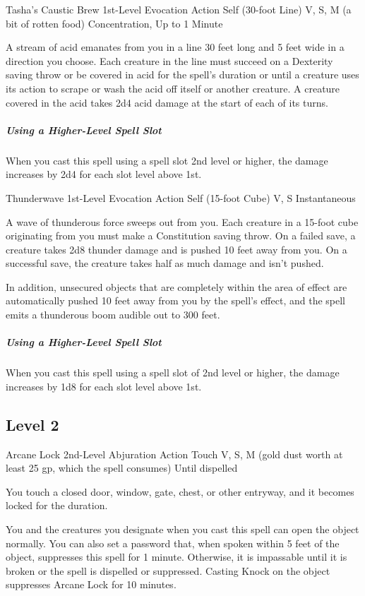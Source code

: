 \documentclass[letterpaper,openany,oneside,twocolumn]{book}
\begin{document}
\DndSpellHeader
  {Tasha's Caustic Brew}
  {1st-Level Evocation}
  {Action}
  {Self (30-foot Line)}
  {V, S, M (a bit of rotten food)}
  {Concentration, Up to 1 Minute}

A stream of acid emanates from you in a line 30 feet long and 5 feet wide in a direction you choose. Each creature in the line must succeed on a Dexterity saving throw or be covered in acid for the spell's duration or until a creature uses its action to scrape or wash the acid off itself or another creature. A creature covered in the acid takes 2d4 acid damage at the start of each of its turns.

\subparagraph*{Using a Higher-Level Spell Slot} When you cast this spell using a spell slot 2nd level or higher, the damage increases by 2d4 for each slot level above 1st.

\DndSpellHeader
  {Thunderwave}
  {1st-Level Evocation}
  {Action}
  {Self (15-foot Cube)}
  {V, S}
  {Instantaneous}

A wave of thunderous force sweeps out from you. Each creature in a 15-foot cube originating from you must make a Constitution saving throw. On a failed save, a creature takes 2d8 thunder damage and is pushed 10 feet away from you. On a successful save, the creature takes half as much damage and isn't pushed.

In addition, unsecured objects that are completely within the area of effect are automatically pushed 10 feet away from you by the spell's effect, and the spell emits a thunderous boom audible out to 300 feet.

\subparagraph*{Using a Higher-Level Spell Slot} When you cast this spell using a spell slot of 2nd level or higher, the damage increases by 1d8 for each slot level above 1st.

\subsection*{Level 2}

\DndSpellHeader
  {Arcane Lock}
  {2nd-Level Abjuration}
  {Action}
  {Touch}
  {V, S, M (gold dust worth at least 25 gp, which the spell consumes)}
  {Until dispelled}

You touch a closed door, window, gate, chest, or other entryway, and it becomes locked for the duration.

You and the creatures you designate when you cast this spell can open the object normally. You can also set a password that, when spoken within 5 feet of the object, suppresses this spell for 1 minute. Otherwise, it is impassable until it is broken or the spell is dispelled or suppressed. Casting Knock on the object suppresses Arcane Lock for 10 minutes.
\end{document}
